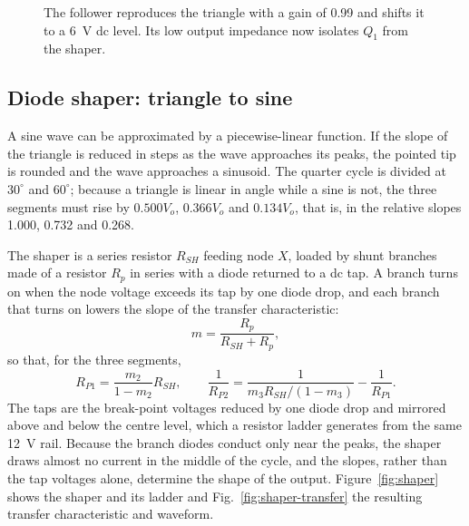 \documentclass[12pt,a4paper]{article}
\newcommand{\TRI}[1]{ifthenelse(mod(#1,1)<0.5,4.55-4.795*exp(-mod(#1,1)/4.64),-4.55+4.795*exp(-(mod(#1,1)-0.5)/4.64))}
\begin{document}
	\begin{figure}[H]
		\centering
		\caption{The follower reproduces the triangle with a gain of 0.99 and shifts it to a \SI{6}{\volt} dc level. Its low output impedance now isolates $Q_1$ from the shaper.}
		\label{fig:q2-wave}
	\end{figure}

	\subsection{Diode shaper: triangle to sine}
	A sine wave can be approximated by a piecewise-linear function. If the slope of the triangle is reduced in steps as the wave approaches its peaks, the pointed tip is rounded and the wave approaches a sinusoid. The quarter cycle is divided at $30^\circ$ and $60^\circ$; because a triangle is linear in angle while a sine is not, the three segments must rise by $0.500V_o$, $0.366V_o$ and $0.134V_o$, that is, in the relative slopes 1.000, 0.732 and 0.268.

	The shaper is a series resistor $R_{SH}$ feeding node $X$, loaded by shunt branches made of a resistor $R_p$ in series with a diode returned to a dc tap. A branch turns on when the node voltage exceeds its tap by one diode drop, and each branch that turns on lowers the slope of the transfer characteristic:
	\begin{equation}
		m=\frac{R_p}{R_{SH}+R_p},
		\label{eq:slope}
	\end{equation}
	so that, for the three segments,
	\begin{equation}
		R_{P1}=\frac{m_2}{1-m_2}R_{SH},
		\qquad
		\frac{1}{R_{P2}}=\frac{1}{m_3R_{SH}/(1-m_3)}-\frac{1}{R_{P1}} .
		\label{eq:rp}
	\end{equation}
	The taps are the break-point voltages reduced by one diode drop and mirrored above and below the centre level, which a resistor ladder generates from the same \SI{12}{\volt} rail. Because the branch diodes conduct only near the peaks, the shaper draws almost no current in the middle of the cycle, and the slopes, rather than the tap voltages alone, determine the shape of the output. Figure~\ref{fig:shaper} shows the shaper and its ladder and Fig.~\ref{fig:shaper-transfer} the resulting transfer characteristic and waveform.
\end{document}
